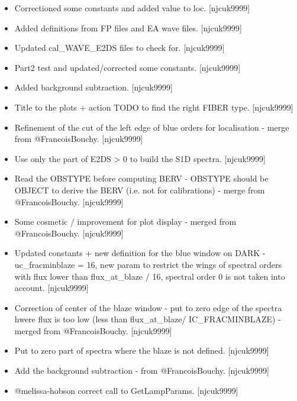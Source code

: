 \documentclass[a4paper,10pt,english]{report}
\begin{document}
\label{\detokenize{misc/changelog:id375}}\begin{itemize}
\item {} 
Correctioned some constants and added value to loc. {[}njcuk9999{]}

\item {} 
Added definitions from FP files and EA wave files. {[}njcuk9999{]}

\item {} 
Updated cal\_WAVE\_E2DS files to check for. {[}njcuk9999{]}

\item {} 
Part2 test and updated/corrected some constants. {[}njcuk9999{]}

\item {} 
Added background subtraction. {[}njcuk9999{]}

\item {} 
Title to the plots + action TODO to find the right FIBER type.
{[}njcuk9999{]}

\item {} 
Refinement of the cut of the left edge of blue orders for localisation
- merge from @FrancoisBouchy. {[}njcuk9999{]}

\item {} 
Use only the part of E2DS \textgreater{} 0 to build the S1D spectra. {[}njcuk9999{]}

\item {} 
Read the OBSTYPE before computing BERV - OBSTYPE should be OBJECT to
derive the BERV (i.e. not for calibrations) - merge from
@FrancoisBouchy. {[}njcuk9999{]}

\item {} 
Some cosmetic / improvement for plot display - merged from
@FrancoisBouchy. {[}njcuk9999{]}

\item {} 
Updated constants + new definition for the blue window on DARK -
uc\_fracminblaze = 16, new param to restrict the wings of spectral
orders with flux lower than flux\_at\_blaze / 16, spectral order 0 is
not taken into account. {[}njcuk9999{]}

\item {} 
Correction of center of the blaze window - put to zero edge of the
spectra hwere flux is too low (less than flux\_at\_blaze/
IC\_FRACMINBLAZE) - merged from @FrancoisBouchy. {[}njcuk9999{]}

\item {} 
Put to zero part of spectra where the blaze is not defined.
{[}njcuk9999{]}

\item {} 
Add the background subtraction - from @FrancoisBouchy. {[}njcuk9999{]}

\item {} 
@melissa-hobson correct call to GetLampParams. {[}njcuk9999{]}

\end{itemize}
\end{document}
